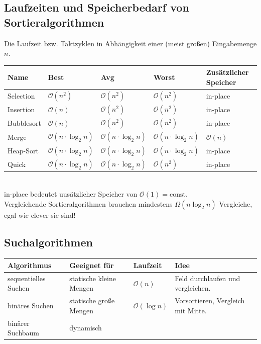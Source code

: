 \documentclass[10pt,a4paper]{scrartcl}
\begin{document}
\subsection{Laufzeiten und Speicherbedarf von Sortieralgorithmen}
Die Laufzeit bzw. Taktzyklen in Abhängigkeit einer (meist großen) Eingabemenge $n$.\\
\begin{tabular}{l|l|l|l|l}
	Name & Best & Avg & Worst & Zusätzlicher Speicher\\ \hline
	Selection & $\mathcal O (n^2)$ & $\mathcal O (n^2)$ & $\mathcal O (n^2)$ & in-place\\
	Insertion & $\mathcal O (n)$ & $\mathcal O (n^2)$ & $\mathcal O (n^2)$ & in-place\\
	Bubblesort & $\mathcal O (n)$ & $\mathcal O (n^2)$ & $\mathcal O (n^2)$ & in-place\\
	Merge & $\mathcal O (n \cdot \log_2 n)$ & $\mathcal O (n \cdot \log_2 n)$ & $\mathcal O (n \cdot \log_2 n)$ & $\mathcal O (n)$\\ %
	Heap-Sort & $\mathcal O (n \cdot \log_2 n)$ & $\mathcal O (n \cdot \log_2 n)$ & $\mathcal O (n \cdot \log_2 n)$ & in-place\\	
	Quick & $\mathcal O (n \cdot \log_2 n)$ & $\mathcal O (n \cdot \log_2 n)$ & $\mathcal O (n^2)$ & in-place\\
\end{tabular}\\
in-place bedeutet uusätzlicher Speicher von $\mathcal O (1) = \text{const.}$\\
Vergleichende Sortieralgorithmen brauchen mindestens $\Omega(n \log_2 n)$ Vergleiche, egal wie clever sie sind!





\subsection{Suchalgorithmen}
\begin{tabular}{l|lll}
	Algorithmus & Geeignet für & Laufzeit & Idee \\ \hline
	sequentielles Suchen & statische kleine Mengen & $\mathcal O(n)$ & Feld durchlaufen und vergleichen.\\
	binäres Suchen & statische große Mengen & $\mathcal O(\log n)$ & Vorsortieren, Vergleich mit Mitte.\\
	binärer Suchbaum & dynamisch & \\
\end{tabular}
\end{document}
